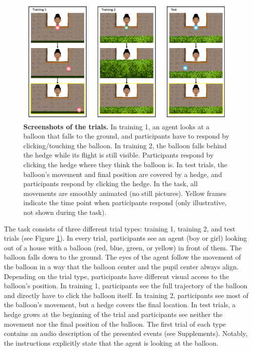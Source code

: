 \documentclass[
  man,floatsintext]{apa7}
\begin{document}
\begin{figure}

{\centering \includegraphics[width=1\linewidth]{../figures/tango-cc-procedure} 

}

\caption{\textbf{Screenshots of the trials.} In training 1, an agent looks at a balloon that falls to the ground, and participants have to respond by clicking/touching the balloon. In training 2, the balloon falls behind the hedge while its flight is still visible. Participants respond by clicking the hedge where they think the balloon is. In test trials, the balloon's movement and final position are covered by a hedge, and participants respond by clicking the hedge. In the task, all movements are smoothly animated (no still pictures). Yellow frames indicate the time point when participants respond (only illustrative, not shown during the task).}\label{fig:fig1}
\end{figure}

The task consists of three different trial types: training 1, training 2, and test trials (see Figure \ref{fig:fig1}).
In every trial, participants see an agent (boy or girl) looking out of a house with a balloon (red, blue, green, or yellow) in front of them.
The balloon falls down to the ground. The eyes of the agent follow the movement of the balloon in a way that the balloon center and the pupil center always align.
Depending on the trial type, participants have different visual access to the balloon's position.
In training 1, participants see the full trajectory of the balloon and directly have to click the balloon itself.
In training 2, participants see most of the balloon's movement, but a hedge covers the final location.
In test trials, a hedge grows at the beginning of the trial and participants see neither the movement nor the final position of the balloon.
The first trial of each type contains an audio description of the presented events (see Supplements).
Notably, the instructions explicitly state that the agent is looking at the balloon.
\end{document}
